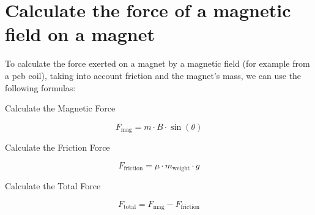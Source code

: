 \section{Calculate the force of a magnetic field on a magnet}

To calculate the force exerted on a magnet by a magnetic field (for example from a pcb coil), taking into account friction and the magnet's mass, we can use the following formulas:

Calculate the Magnetic Force

\[
	F_{\text{mag}} = m \cdot B \cdot \sin(\theta)
\]

Calculate the Friction Force

\[
	F_{\text{friction}} = \mu \cdot m_{\text{weight}} \cdot g
\]

Calculate the Total Force

\[
	F_{\text{total}} = F_{\text{mag}} - F_{\text{friction}}
\]


